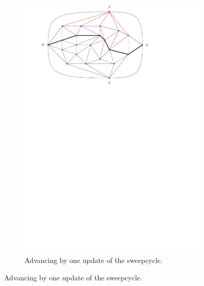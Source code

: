 \begin{figure}
    \centering
    \ContinuedFloat
    \begin{subfigure}[b]{.9 \textwidth}
      \includegraphics[width=\textwidth]{examples/img/smallExample/smallExample-3}
      \caption{Advancing by one update of the sweepcycle.}
      \label{fig:ex:simple:3}
    \end{subfigure}


\end{figure}
